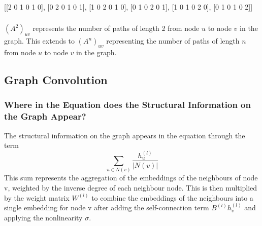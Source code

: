 \documentclass[a4paper]{article}
\begin{document}
\subsubsection{}
[[2 0 1 0 1 0], [0 2 0 1 0 1], [1 0 2 0 1 0], [0 1 0 2 0 1], [1 0 1 0 2 0], [0 1 0 1 0 2]]

\subsubsection{}
$(A^2)_{uv}$ represents the number of paths of length 2 from node $u$ to node $v$ in the graph. This extends to 
$(A^n)_{uv}$ representing the number of paths of length $n$ from node $u$ to node $v$ in the graph.
\bigskip

\subsection{Graph Convolution}
\subsubsection{Where in the Equation does the Structural Information on the Graph Appear?}
The structural information on the graph appears in the equation through the term
$$\sum_{u\in N(v)} \frac{h_u^{(l)}}{|N(v)|}$$
This sum represents the aggregation of the embeddings of the neighbours of node v, weighted by the inverse degree of
each neighbour node. This is then multiplied by the weight matrix $W^{(l)}$ to combine the embeddings of the
neighbours into a single embedding for node v after adding the self-connection term $B^{(l)}h_v^{(l)}$ and applying
the nonlinearity $\sigma$.
\end{document}

